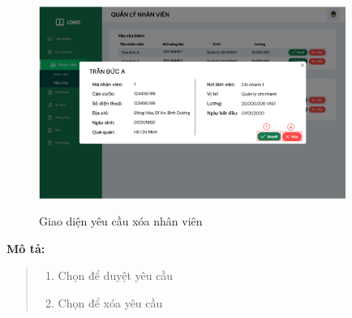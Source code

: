             \begin{figure}[!htp]
                \centering
                \includegraphics[width=10cm]{img/UI/admin/staff_request_delete.png}
                \label{28}
                \newline
                \caption{Giao diện yêu cầu xóa nhân viên}
            \end{figure}
            \textbf{Mô tả:}  
            \begin{quote}
                \begin{enumerate}
                    \item Chọn để duyệt yêu cầu
                    \item Chọn để xóa yêu cầu
                \end{enumerate}
            \end{quote}
        
